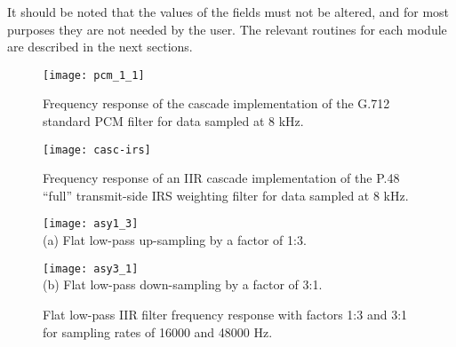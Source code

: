 It should be noted that the values of the fields must not be altered,
and for most purposes they are not needed by the user.  The relevant
routines for each module are described in the next sections.

\begin{figure}[hbtp]
  \begin{center}
\texttt{[image: pcm\_1\_1]}
    \\
  \end{center}
  \caption{\SF Frequency response of the cascade implementation of the G.712
               standard PCM filter for data sampled at 8 kHz.
               \label{casc-g712-8k}}
\end{figure}


\begin{figure}[tp]
  \begin{center}
\texttt{[image: casc-irs]}
    \\
  \end{center}
  \caption{ Frequency response of an IIR cascade implementation of
            the P.48 ``full'' transmit-side IRS weighting filter for
            data sampled at 8 kHz.
            \label{casc-irs-8k} }
\end{figure}


\begin{figure}[hbtp]
  \begin{center}
\texttt{[image: asy1\_3]}
    \\
   (a) Flat low-pass up-sampling by a factor of 1:3.

\texttt{[image: asy3\_1]}
    \\
   (b) Flat low-pass down-sampling by a factor of 3:1.

  \end{center}
  \caption{\SF Flat low-pass IIR filter frequency response
               with factors 1:3 and 3:1 for sampling rates of 16000
               and 48000 Hz.\label{casc-lp-3-1}}
\end{figure}


